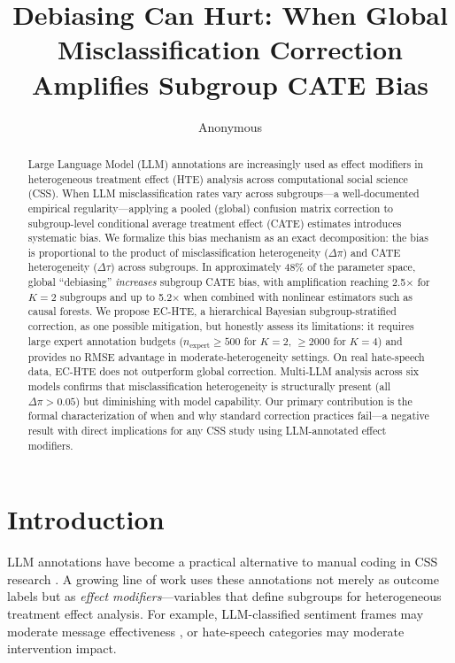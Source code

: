 \documentclass[11pt]{article}
\title{Debiasing Can Hurt: When Global Misclassification Correction\\Amplifies Subgroup CATE Bias}
\author{Anonymous}
\begin{document}
\maketitle

\begin{abstract}
Large Language Model (LLM) annotations are increasingly used as effect modifiers in heterogeneous treatment effect (HTE) analysis across computational social science (CSS).
When LLM misclassification rates vary across subgroups---a well-documented empirical regularity---applying a pooled (global) confusion matrix correction to subgroup-level conditional average treatment effect (CATE) estimates introduces systematic bias.
We formalize this bias mechanism as an exact decomposition: the bias is proportional to the product of misclassification heterogeneity ($\Delta\pi$) and CATE heterogeneity ($\Delta\tau$) across subgroups.
In approximately 48\% of the parameter space, global ``debiasing'' \emph{increases} subgroup CATE bias, with amplification reaching 2.5$\times$ for $K{=}2$ subgroups and up to 5.2$\times$ when combined with nonlinear estimators such as causal forests.
We propose EC-HTE, a hierarchical Bayesian subgroup-stratified correction, as one possible mitigation, but honestly assess its limitations: it requires large expert annotation budgets ($n_{\text{expert}} \geq 500$ for $K{=}2$, $\geq 2000$ for $K{=}4$) and provides no RMSE advantage in moderate-heterogeneity settings.
On real hate-speech data, EC-HTE does not outperform global correction.
Multi-LLM analysis across six models confirms that misclassification heterogeneity is structurally present (all $\Delta\pi > 0.05$) but diminishing with model capability.
Our primary contribution is the formal characterization of when and why standard correction practices fail---a negative result with direct implications for any CSS study using LLM-annotated effect modifiers.
\end{abstract}

\section{Introduction}
\label{sec:intro}

LLM annotations have become a practical alternative to manual coding in CSS research \citep{gilardi2023chatgpt,tornberg2024chatgpt4,ziems2024can}.
A growing line of work uses these annotations not merely as outcome labels but as \emph{effect modifiers}---variables that define subgroups for heterogeneous treatment effect analysis.
For example, LLM-classified sentiment frames may moderate message effectiveness \citep{ashwin2025using}, or hate-speech categories may moderate intervention impact.
\end{document}
